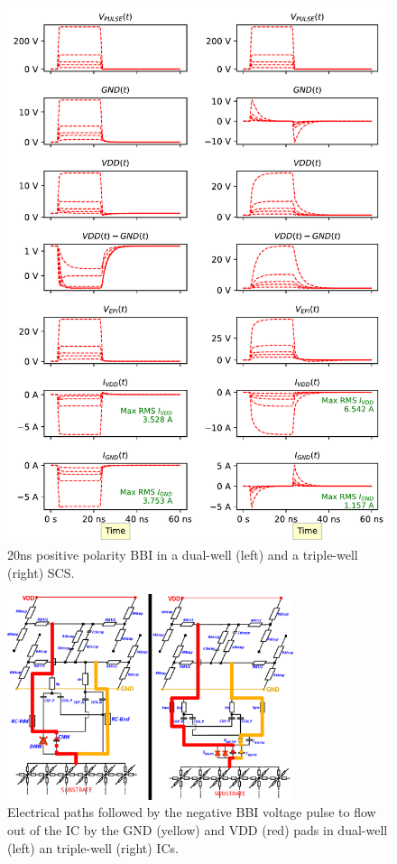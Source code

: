 \documentclass[10pt, conference, compsocconf]{IEEEtran}
\begin{document}
\begin{figure}[!hbtp]
\centering
\includegraphics[width=6in]{POSITIVE_COMP.pdf}
\caption{20ns positive polarity BBI in a dual-well (left) and a triple-well (right) SCS.}
\label{fig_pos_comp}
\end{figure}

\begin{figure}[!ht]
\centering
\includegraphics[width=3.3in]{neg_path_comp.eps}
\caption{Electrical paths followed by the negative BBI voltage pulse to flow out of the IC by the GND (yellow) and VDD (red) pads in dual-well (left) an triple-well (right) ICs.}
\label{fig_neg_path}
\end{figure}
\end{document}
